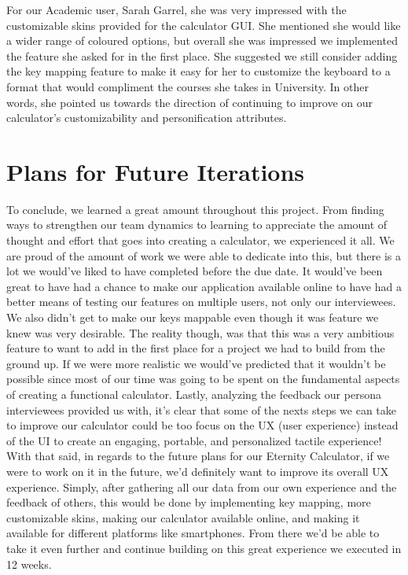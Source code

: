\documentclass[a4paper, 12pt]{article}
\begin{document}
For our Academic user, Sarah Garrel, she was very impressed with the customizable skins provided for the calculator GUI. She mentioned she would like a wider range of coloured options, but overall she was impressed we implemented the feature she asked for in the first place. She suggested we still consider adding the key mapping feature to make it easy for her to customize the keyboard to a format that would compliment the courses she takes in University. In other words, she pointed us towards the direction of continuing to improve  on our calculator’s customizability and personification attributes. 


\section{Plans for Future Iterations}

To conclude, we learned a great amount throughout this project. From finding ways to strengthen our team dynamics to learning to appreciate the amount of thought and effort that goes into creating a calculator, we experienced it all. We are proud of the amount of work we were able to dedicate into this, but there is a lot we would’ve liked to have completed before the due date. It would’ve been great to have had a chance to make our application available online to have had a better means of testing our features on multiple users, not only our interviewees. We also didn’t get to make our keys mappable even though it was feature we knew was very desirable. The reality though, was that this was a very ambitious feature to want to add in the first place for a project we had to build from the ground up. If we were more realistic we would’ve predicted that it wouldn’t be possible since most of our time was going to be spent on the fundamental aspects of creating a functional calculator. Lastly, analyzing the feedback our persona interviewees provided us with, it’s clear that some of the nexts steps we can take to improve our calculator could be too focus on the UX (user experience) instead of the UI to create an engaging, portable, and personalized tactile experience! 
\\

With that said, in regards to the future plans for our Eternity Calculator, if we were to work on it in the future, we’d definitely want to improve its overall UX experience. Simply, after gathering all our data from our own experience and the feedback of others, this would be done by implementing key mapping, more customizable skins, making our calculator available online, and making it available for different platforms like smartphones. From there we’d be able to take it even further and continue building on this great experience we executed in 12 weeks.
\end{document}
